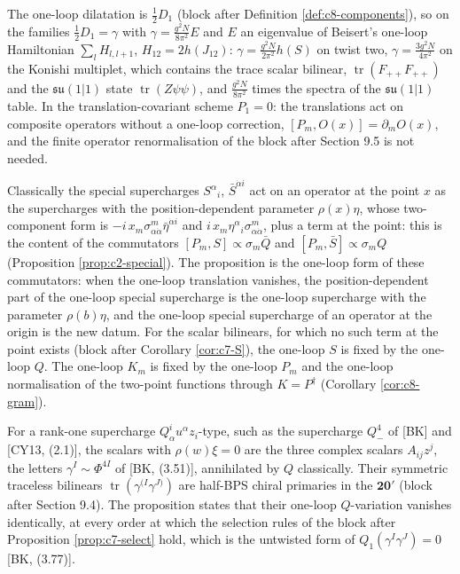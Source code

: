 \begin{remark}
The one-loop dilatation is $\tfrac12D_1$ (block after Definition \ref{def:c8-components}), so on the families $\tfrac12D_1=\gamma$ with $\gamma=\frac{g^2N}{8\pi^2}E$ and $E$ an eigenvalue of Beisert's one-loop Hamiltonian $\sum_lH_{l,l+1}$, $H_{12}=2h(J_{12})$: $\gamma=\frac{g^2N}{2\pi^2}h(S)$ on twist two, $\gamma=\frac{3g^2N}{4\pi^2}$ on the Konishi multiplet, which contains the trace scalar bilinear, $\operatorname{tr}(F_{++}F_{++})$ and the $\mathfrak{su}(1|1)$ state $\operatorname{tr}(Z\psi\psi)$, and $\frac{g^2N}{8\pi^2}$ times the spectra of the $\mathfrak{su}(1|1)$ table. In the translation-covariant scheme $P_1=0$: the translations act on composite operators without a one-loop correction, $[P_m,O(x)]=\partial_mO(x)$, and the finite operator renormalisation of the block after Section 9.5 is not needed.
\end{remark}

\begin{remark}
Classically the special supercharges $S^\alpha{}_i$, $\bar S^{\dot\alpha i}$ act on an operator at the point $x$ as the supercharges with the position-dependent parameter $\rho(x)\eta$, whose two-component form is $-i\,x_m\sigma^m_{\alpha\dot\alpha}\bar\eta^{\dot\alpha i}$ and $i\,x_m\eta^\alpha{}_i\sigma^m_{\alpha\dot\alpha}$, plus a term at the point: this is the content of the commutators $[P_m,S]\propto\sigma_m\bar Q$ and $[P_m,\bar S]\propto\sigma_mQ$ (Proposition \ref{prop:c2-special}). The proposition is the one-loop form of these commutators: when the one-loop translation vanishes, the position-dependent part of the one-loop special supercharge is the one-loop supercharge with the parameter $\rho(b)\eta$, and the one-loop special supercharge of an operator at the origin is the new datum. For the scalar bilinears, for which no such term at the point exists (block after Corollary \ref{cor:c7-S}), the one-loop $S$ is fixed by the one-loop $Q$. The one-loop $K_m$ is fixed by the one-loop $P_m$ and the one-loop normalisation of the two-point functions through $K=P^\dagger$ (Corollary \ref{cor:c8-gram}).
\end{remark}

\begin{remark}
For a rank-one supercharge $Q^i_\alpha u^\alpha z_i$-type, such as the supercharge $Q^4_-$ of [BK] and [CY13, (2.1)], the scalars with $\rho(w)\xi=0$ are the three complex scalars $A_{ij}z^j$, the letters $\gamma^I\sim\Phi^{4I}$ of [BK, (3.51)], annihilated by $Q$ classically. Their symmetric traceless bilinears $\operatorname{tr}(\gamma^{(I}\gamma^{J)})$ are half-BPS chiral primaries in the $\mathbf{20'}$ (block after Section 9.4). The proposition states that their one-loop $Q$-variation vanishes identically, at every order at which the selection rules of the block after Proposition \ref{prop:c7-select} hold, which is the untwisted form of $Q_1(\gamma^I\gamma^J)=0$ [BK, (3.77)].
\end{remark}

